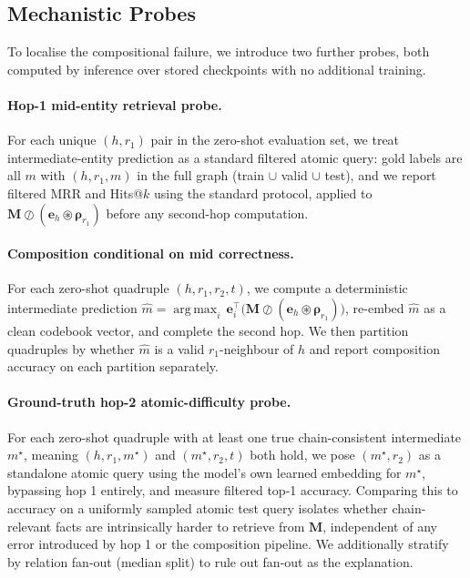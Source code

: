 \documentclass[11pt]{article}
\theoremstyle{definition}
\newcommand{\bind}{\circledast}
\newcommand{\unbind}{\oslash}
\newcommand{\ev}[1]{\mathbf{e}_{#1}}
\newcommand{\rv}[1]{\boldsymbol{\rho}_{#1}}
\newcommand{\mem}{\mathbf{M}}
\DeclareMathOperator*{\argmaxop}{arg\,max}
\begin{document}
\subsection{Mechanistic Probes}
\label{sec:probes-mechanism}

To localise the compositional failure, we introduce two further probes,
both computed by inference over stored checkpoints with no additional training.

\paragraph{Hop-1 mid-entity retrieval probe.}
For each unique $(h, r_1)$ pair in the zero-shot evaluation set, we treat
intermediate-entity prediction as a standard filtered atomic query: gold labels
are all $m$ with $(h, r_1, m)$ in the full graph (train $\cup$ valid $\cup$
test), and we report filtered MRR and Hits@$k$ using the standard protocol,
applied to $\mem \unbind (\ev{h} \bind \rv{r_1})$ before any second-hop
computation.

\paragraph{Composition conditional on mid correctness.}
For each zero-shot quadruple $(h, r_1, r_2, t)$, we compute a deterministic
intermediate prediction $\hat m = \argmaxop_i\,
\ev{i}^\top\bigl(\mem \unbind (\ev{h}\bind\rv{r_1})\bigr)$, re-embed
$\hat m$ as a clean codebook vector, and complete the second hop. We then
partition quadruples by whether $\hat m$ is a valid $r_1$-neighbour of $h$
and report composition accuracy on each partition separately.

\paragraph{Ground-truth hop-2 atomic-difficulty probe.}
For each zero-shot quadruple with at least one true chain-consistent intermediate
$m^\star$, meaning $(h,r_1,m^\star)$ and $(m^\star, r_2, t)$ both hold, we pose
$(m^\star, r_2)$ as a standalone atomic query using the model's own learned
embedding for $m^\star$, bypassing hop 1 entirely, and measure filtered top-1
accuracy. Comparing this to accuracy on a uniformly sampled atomic test query
isolates whether chain-relevant facts are intrinsically harder to retrieve from
$\mem$, independent of any error introduced by hop 1 or the composition
pipeline. We additionally stratify by relation fan-out (median split) to rule
out fan-out as the explanation.
\end{document}
